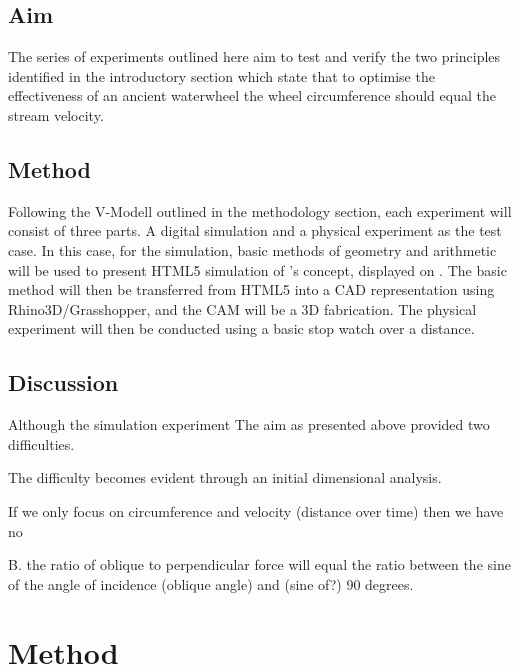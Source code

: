 \documentclass[a4paper, 12pt]{article}
\begin{document}
\subsection{Aim}

The series of experiments outlined here aim to test and verify the two principles identified in the introductory section which state that to optimise the effectiveness of an ancient waterwheel the wheel circumference should equal the stream velocity.

\subsection{Method}

Following the V-Modell outlined in the methodology section, each experiment will consist of three parts. A digital simulation and a physical experiment as the test case. In this case, for the simulation, basic methods of geometry and arithmetic will be used to present HTML5 simulation of \citeyear{smeaton_experimental_1759}'s concept, displayed on \cite{maud_principle_2022}. The basic method will then be transferred from HTML5 into a CAD representation using Rhino3D/Grasshopper, and the CAM will be a 3D fabrication. The physical experiment will then be conducted using a basic stop watch over a distance.

\subsection{Discussion}

Although the simulation experiment The aim as presented above provided two difficulties.


The difficulty becomes evident through an initial dimensional analysis.

If we only focus on circumference and velocity (distance over time) then we have no






B. the ratio of oblique to perpendicular force will equal the ratio between the sine of  the angle of incidence (oblique angle) and (sine of?) 90 degrees.



\section{Method}




\printbibliography
\end{document}
